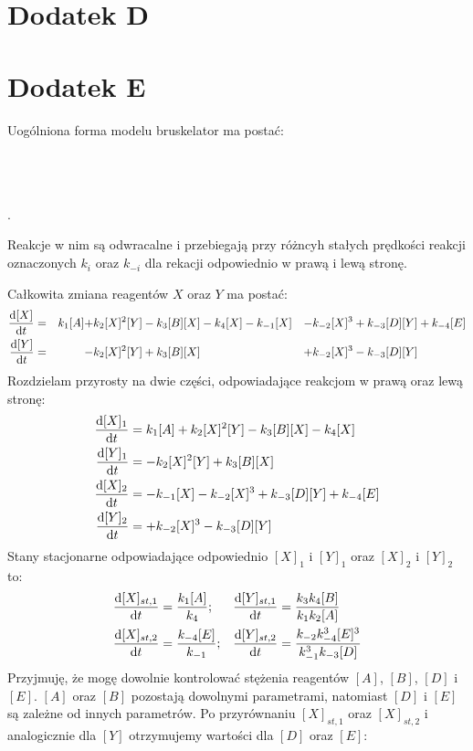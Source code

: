 \documentclass[10pt, a4paper, twoside, onecolumn]{article}
\numberwithin{equation}{section}
\begin{document}
	\section{Dodatek D}
	
	\section{Dodatek E}
	Uogólniona forma modelu bruskelator ma postać:
	\begin{center}
		 \\
		 \\
		 \\
		.
	\end{center}
	Reakcje w nim są odwracalne i przebiegają przy różncyh stałych prędkości reakcji oznaczonych \(k_{i}\) oraz \(k_{-i}\) dla rekacji odpowiednio w prawą i lewą stronę. \par
	Całkowita zmiana reagentów \(X\) oraz \(Y\) ma postać:
	\begin{align}
		\dv{[X]}{t} &=& k_{1}[A] +& k_{2}[X]^{2}[Y] - k_{3}[B][X] - k_{4}[X] - k_{-1}[X] &-& k_{-2}[X]^{3} + k_{-3}[D][Y] + k_{-4}[E] \\
		\dv{[Y]}{t} &=& -& k_{2}[X]^{2}[Y] + k_{3}[B][X] &+& k_{-2}[X]^{3} - k_{-3}[D][Y]
	\end{align}
	Rozdzielam przyrosty na dwie części, odpowiadające reakcjom w prawą oraz lewą stronę:
	\begin{align}
		\dv{[X]_{1}}{t} &= k_{1}[A] + k_{2}[X]^{2}[Y] - k_{3}[B][X] - k_{4}[X] \\
		\dv{[Y]_{1}}{t} &= - k_{2}[X]^{2}[Y] + k_{3}[B][X] \\
		\dv{[X]_{2}}{t} &= - k_{-1}[X] - k_{-2}[X]^{3} + k_{-3}[D][Y] + k_{-4}[E] \\
		\dv{[Y]_{2}}{t} &= + k_{-2}[X]^{3} - k_{-3}[D][Y]
	\end{align}
	Stany stacjonarne odpowiadające odpowiednio \([X]_{1}\) i \([Y]_{1}\) oraz \([X]_{2}\) i \([Y]_{2}\) to:
	\begin{align}
		\dv{[X]_{st, 1}}{t} &= \frac{k_{1}[A]}{k_{4}}; & \dv{[Y]_{st, 1}}{t} &= \frac{k_{3}k_{4}[B]}{k_{1}k_{2}[A]} \\
		\dv{[X]_{st, 2}}{t} &= \frac{k_{-4}[E]}{k_{-1}}; & \dv{[Y]_{st, 2}}{t} &= \frac{k_{-2}k_{-4}^{3}[E]^{3}}{k_{-1}^{3}k_{-3}[D]}
	\end{align}
	Przyjmuję, że mogę dowolnie kontrolować stężenia reagentów \([A]\), \([B]\), \([D]\) i \([E]\). \([A]\) oraz \([B]\) pozostają dowolnymi parametrami, natomiast \([D]\) i \([E]\) są zależne od innych parametrów. Po przyrównaniu \([X]_{st, 1}\) oraz \([X]_{st, 2}\) i analogicznie dla \([Y]\) otrzymujemy wartości dla \([D]\) oraz \([E]\):
\end{document}
